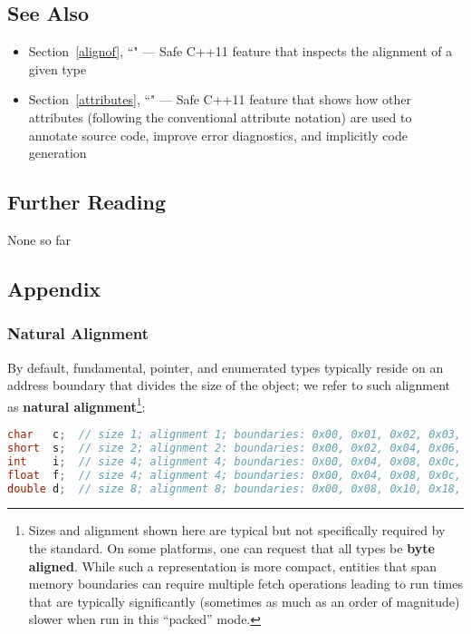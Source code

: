 \subsection[See Also]{See Also}\label{see-also}

\begin{itemize}
\item{Section~\ref{alignof}, ``" — Safe C++11 feature that inspects the alignment of a given type}
\item{Section~\ref{attributes}, ``" — Safe C++11 feature that shows how other attributes (following the conventional attribute notation) are used to annotate source code, improve error diagnostics, and implicitly code generation} %
\end{itemize}

\subsection[Further Reading]{Further Reading}\label{further-reading}

None so far

\subsection[Appendix]{Appendix}\label{alignas-appendix}

\subsubsection[Natural Alignment]{Natural Alignment}\label{natural-alignment}

By default, fundamental, pointer, and enumerated types typically reside
on an address boundary that divides the size of the object; we refer to
such alignment as \textbf{natural alignment}{\cprotect\footnote{Sizes
and alignment shown here are typical but not specifically required by
the standard. On some platforms, one can request that all
types be \textbf{byte aligned}. While such a representation is more
compact, entities that span memory boundaries can require multiple
fetch operations leading to run times that are typically
significantly (sometimes as much as an order of magnitude) slower when
  run in this ``packed'' mode.}}:

\begin{lstlisting}[language=C++]
char   c;  // size 1; alignment 1; boundaries: 0x00, 0x01, 0x02, 0x03, ...
short  s;  // size 2; alignment 2: boundaries: 0x00, 0x02, 0x04, 0x06, ...
int    i;  // size 4; alignment 4; boundaries: 0x00, 0x04, 0x08, 0x0c, ...
float  f;  // size 4; alignment 4; boundaries: 0x00, 0x04, 0x08, 0x0c, ...
double d;  // size 8; alignment 8; boundaries: 0x00, 0x08, 0x10, 0x18, ...
\end{lstlisting}

